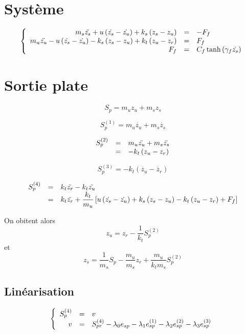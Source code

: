 \documentclass[10pt]{article}
\begin{document}
\section{Système}

\[
\left\{
\begin{array}{r c l}
  m_s \ddot{z_s} + u \left( \dot{z_s} - \dot{z_u} \right) + k_s \left( z_s - z_u \right) & = & - F_f \\
  m_u \ddot{z_u} - u \left( \dot{z_s} - \dot{z_u} \right) - k_s \left( z_s - z_u \right) + k_t \left( z_u - z_r \right) & = & F_f \\
  F_f & = & C_f \tanh\left(\gamma_f \dot{z_s} \right) \\
\end{array}
\right.
\]

\section{Sortie plate}
\[
S_p = m_u z_u + m_s z_s
\]

\[
S_p^{(1)} = m_u \dot{z_u} + m_s \dot{z_s}
\]

\[
\begin{array}{r c l}
  S_p^{(2)} &=& m_u \ddot{z_u} + m_s \ddot{z_s} \\
  &=& - k_t \left( z_u - z_r \right) \\
\end{array}
\]

\[
S_p^{(3)} = - k_t \left( \dot{z_u} - \dot{z_r} \right)
\]

\[
\begin{array}{r c l}
  S_p^{(4)} &=& k_t \ddot{z_r} - k_t \ddot{z_u} \\
  &=& k_t \ddot{z_r} + \dfrac{k_t}{m_u} \left[ u \left( \dot{z_s} - \dot{z_u} \right) + k_s \left( z_s - z_u \right) - k_t \left( z_u - z_r \right) + F_f \right] \\
\end{array}
\]

On obitent alors
\[
z_u = z_r - \dfrac{1}{k_t} S_p^{(2)}
\]
et
\[
z_s = \dfrac{1}{m_s} S_p - \dfrac{m_u}{m_s} z_r + \dfrac{m_u}{k_t m_s} S_p^{(2)}
\]

\subsection{Linéarisation}

\[
\left\{
\begin{array}{r c l}
  S_p^{(4)} &=& v \\
  v &=& S_{pr}^{(4)} - \lambda_0 e_{sp} - \lambda_1 e_{sp}^{(1)} - \lambda_2 e_{sp}^{(2)} - \lambda_3 e_{sp}^{(3)} \\
\end{array}
\right.
\]
\end{document}
